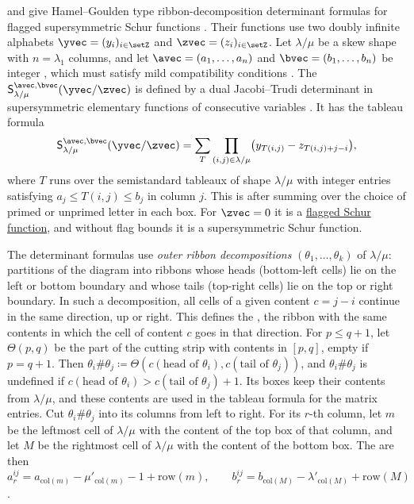  and  give
Hamel--Goulden type ribbon-decomposition determinant formulas for flagged
supersymmetric Schur functions \cite{AdilzhanYeliussizov2025x}.
Their functions use two doubly infinite alphabets
$\yvec=(y_i)_{i\in\setZ}$ and $\zvec=(z_i)_{i\in\setZ}$.  Let $\lambda/\mu$
be a skew shape with $n=\lambda_1$ columns, and let
$\avec=(a_1,\dotsc,a_n)$ and $\bvec=(b_1,\dotsc,b_n)$ be integer
, which must satisfy mild compatibility conditions
\cite[Def.~3.1]{AdilzhanYeliussizov2025x}.  The
\label{flaggedSupersymmetricSchur}
$\mathsf{S}^{\avec,\bvec}_{\lambda/\mu}(\yvec/\zvec)$ is defined by a dual
Jacobi--Trudi determinant in supersymmetric elementary functions of
consecutive variables \cite[Def.~3.2]{AdilzhanYeliussizov2025x}.  It has the
tableau formula
\[
  \mathsf{S}^{\avec,\bvec}_{\lambda/\mu}(\yvec/\zvec)
  =\sum_{T}\prod_{(i,j)\in\lambda/\mu}\bigl(y_{T(i,j)}-z_{T(i,j)+j-i}\bigr),
\]
where $T$ runs over the semistandard tableaux of shape $\lambda/\mu$ with
integer entries satisfying $a_j\leq T(i,j)\leq b_j$ in column $j$.  This is
\cite[Thm.~4.5]{AdilzhanYeliussizov2025x} after summing over the choice of
primed or unprimed letter in each box.  For $\zvec=0$ it is a
\hyperref[flaggedSchurPolynomialDefinition]{flagged Schur function}, and
without flag bounds it is a supersymmetric Schur function.

The determinant formulas use \emph{outer ribbon decompositions}
$(\theta_1,\dotsc,\theta_k)$ of $\lambda/\mu$: partitions of the diagram into
ribbons whose heads (bottom-left cells) lie on the left or bottom boundary and
whose tails (top-right cells) lie on the top or right boundary.  In such a
decomposition, all cells of a given content $c=j-i$ continue in the same
direction, up or right.  This defines the , the ribbon
with the same contents in which the cell of content $c$ goes in that direction.
For $p\leq q+1$, let $\Theta(p,q)$ be the part of the cutting strip with
contents in $[p,q]$, empty if $p=q+1$.  Then
$\theta_i\#\theta_j\coloneqq\Theta(c(\text{head of }\theta_i),c(\text{tail of }\theta_j))$,
and $\theta_i\#\theta_j$ is undefined if
$c(\text{head of }\theta_i)>c(\text{tail of }\theta_j)+1$.
Its boxes keep their contents from $\lambda/\mu$, and these contents are used
in the tableau formula for the matrix entries.  Cut $\theta_i\#\theta_j$ into
its columns from left to right.  For its $r$-th column, let $m$ be the leftmost
cell of $\lambda/\mu$ with the content of the top box of that column, and let
$M$ be the rightmost cell of $\lambda/\mu$ with the content of the bottom box.
The  are then
\[
  a^{ij}_r=a_{\mathrm{col}(m)}-\mu'_{\mathrm{col}(m)}-1+\mathrm{row}(m),
  \qquad
  b^{ij}_r=b_{\mathrm{col}(M)}-\lambda'_{\mathrm{col}(M)}+\mathrm{row}(M)
\]
\cite[Def.~5.4]{AdilzhanYeliussizov2025x}.

